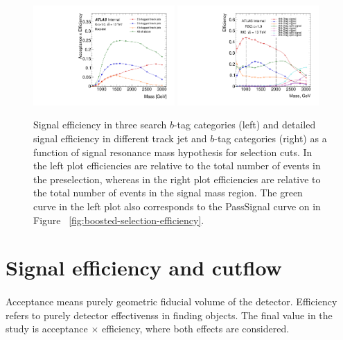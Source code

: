 \begin{figure}
\begin{center}
\includegraphics[width=0.48\textwidth,angle=-90]{figures/boosted/SigEff/region_lst_Moriond_bkg_9_Efficiency_PreSel.pdf}
\includegraphics[width=0.48\textwidth,angle=-90]{figures/boosted/SigEff/detail_lst_Moriond_Efficiency_AllTag_Signal.pdf}
  \caption{Signal efficiency in three search $b$-tag categories (left) and detailed signal efficiency in different track jet and $b$-tag categories (right) as a function of signal resonance mass hypothesis for selection cuts. In the left plot efficiencies are relative to the total number of events in the preselection, whereas in the right plot efficiencies are relative to the total number of events in the signal mass region. The green curve in the left plot also corresponds to the PassSignal curve on in Figure ~\ref{fig:boosted-selection-efficiency}.}
  \label{fig:boosted-nbjet-signal-efficiency}
\end{center}
\end{figure}



\section{Signal efficiency and cutflow}
\paragraph{}
Acceptance means purely geometric fiducial volume of the detector. Efficiency refers to purely detector effectivenss in finding objects. The final value in the study is acceptance $\times$ efficiency, where both effects are considered.

